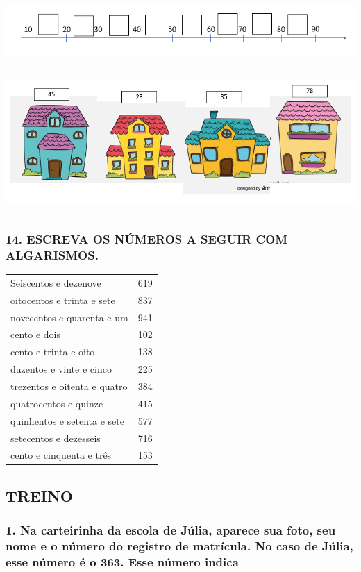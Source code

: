 \includegraphics[width=5.90556in,height=0.83681in]{media/image10.png}

\includegraphics[width=5.90556in,height=2.10972in]{media/image11.png}

\subsubsection{14. ESCREVA OS NÚMEROS A SEGUIR COM ALGARISMOS.}\label{section-2}

\begin{longtable}[]{@{}ll@{}}
\toprule
Seiscentos e dezenove & 619\tabularnewline
oitocentos e trinta e sete & 837\tabularnewline
novecentos e quarenta e um & 941\tabularnewline
cento e dois & 102\tabularnewline
cento e trinta e oito & 138\tabularnewline
duzentos e vinte e cinco & 225\tabularnewline
trezentos e oitenta e quatro & 384\tabularnewline
quatrocentos e quinze & 415\tabularnewline
quinhentos e setenta e sete & 577\tabularnewline
setecentos e dezesseis & 716\tabularnewline
cento e cinquenta e três & 153\tabularnewline
\bottomrule
\end{longtable}

\subsubsection{}\label{section-3}

\subsection{TREINO}\label{treino}

\subsubsection{1. Na carteirinha da escola de Júlia, aparece sua foto, seu nome e o número do
registro de matrícula. No caso de Júlia, esse número é o 363. Esse número indica}\label{section-4}

